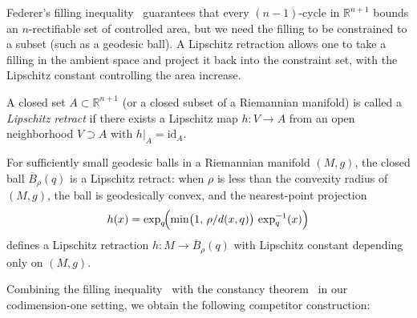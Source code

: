 Federer's filling inequality~\cite[4.5.9(31)]{Fed69} guarantees that every $(n-1)$-cycle in $\mathbb{R}^{n+1}$ bounds an $n$-rectifiable set of controlled area, but we need the filling to be constrained to a subset (such as a geodesic ball). A Lipschitz retraction allows one to take a filling in the ambient space and project it back into the constraint set, with the Lipschitz constant controlling the area increase.

\begin{definition}\label{def:lipschitz-retract}
A closed set $A \subset \mathbb{R}^{n+1}$ (or a closed subset of a Riemannian manifold) is called a \emph{Lipschitz retract} if there exists a Lipschitz map $h\colon V \to A$ from an open neighborhood $V \supset A$ with $h|_A = \mathrm{id}_A$.
\end{definition}

For sufficiently small geodesic balls in a Riemannian manifold $(M,g)$, the closed ball $\overline{B}_\rho(q)$ is a Lipschitz retract: when $\rho$ is less than the convexity radius of $(M,g)$, the ball is geodesically convex, and the nearest-point projection
\[
    h(x) = \exp_q\!\Bigl(\min\bigl(1,\, \rho/d(x,q)\bigr)\, \exp_q^{-1}(x)\Bigr)
\]
defines a Lipschitz retraction $h\colon M \to \overline{B}_\rho(q)$ with Lipschitz constant depending only on $(M,g)$.

Combining the filling inequality~\cite[4.5.9(31)]{Fed69} with the constancy theorem~\cite[Theorem~26.27]{Sim83} in our codimension-one setting, we obtain the following competitor construction:

